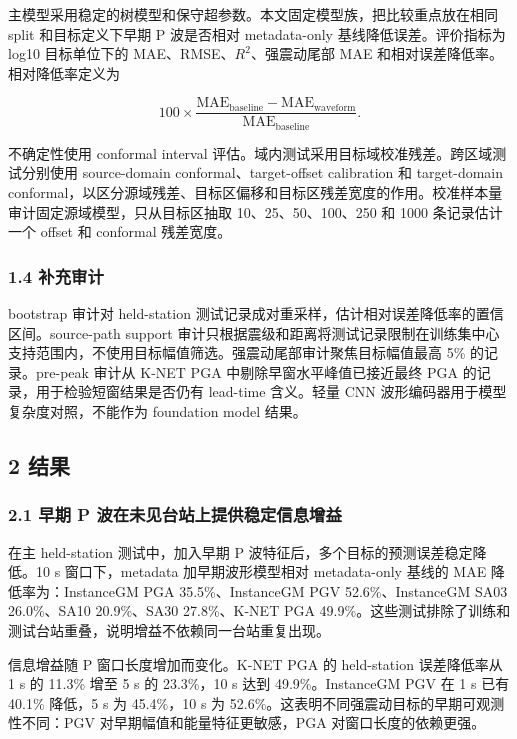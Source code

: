 \documentclass[
  11pt,
]{ctexart}
\begin{document}
主模型采用稳定的树模型和保守超参数。本文固定模型族，把比较重点放在相同
split 和目标定义下早期 P 波是否相对 metadata-only
基线降低误差。评价指标为 log10 目标单位下的
MAE、RMSE、\(R^2\)、强震动尾部 MAE 和相对误差降低率。相对降低率定义为

\[
100 \times \frac{\mathrm{MAE}_{\mathrm{baseline}}-\mathrm{MAE}_{\mathrm{waveform}}}{\mathrm{MAE}_{\mathrm{baseline}}}.
\]

不确定性使用 conformal interval
评估。域内测试采用目标域校准残差。跨区域测试分别使用 source-domain
conformal、target-offset calibration 和 target-domain
conformal，以区分源域残差、目标区偏移和目标区残差宽度的作用。校准样本量审计固定源域模型，只从目标区抽取
10、25、50、100、250 和 1000 条记录估计一个 offset 和 conformal
残差宽度。

\subsubsection{1.4 补充审计}\label{ux8865ux5145ux5ba1ux8ba1}

bootstrap 审计对 held-station
测试记录成对重采样，估计相对误差降低率的置信区间。source-path support
审计只根据震级和距离将测试记录限制在训练集中心支持范围内，不使用目标幅值筛选。强震动尾部审计聚焦目标幅值最高
5\% 的记录。pre-peak 审计从 K-NET PGA 中剔除早窗水平峰值已接近最终 PGA
的记录，用于检验短窗结果是否仍有 lead-time 含义。轻量 CNN
波形编码器用于模型复杂度对照，不能作为 foundation model 结果。

\subsection{2 结果}\label{ux7ed3ux679c}

\subsubsection{2.1 早期 P
波在未见台站上提供稳定信息增益}\label{ux65e9ux671f-p-ux6ce2ux5728ux672aux89c1ux53f0ux7ad9ux4e0aux63d0ux4f9bux7a33ux5b9aux4fe1ux606fux589eux76ca}

在主 held-station 测试中，加入早期 P
波特征后，多个目标的预测误差稳定降低。10 s 窗口下，metadata
加早期波形模型相对 metadata-only 基线的 MAE 降低率为：InstanceGM PGA
35.5\%、InstanceGM PGV 52.6\%、InstanceGM SA03 26.0\%、SA10 20.9\%、SA30
27.8\%、K-NET PGA
49.9\%。这些测试排除了训练和测试台站重叠，说明增益不依赖同一台站重复出现。

信息增益随 P 窗口长度增加而变化。K-NET PGA 的 held-station 误差降低率从
1 s 的 11.3\% 增至 5 s 的 23.3\%，10 s 达到 49.9\%。InstanceGM PGV 在 1
s 已有 40.1\% 降低，5 s 为 45.4\%，10 s 为
52.6\%。这表明不同强震动目标的早期可观测性不同：PGV
对早期幅值和能量特征更敏感，PGA 对窗口长度的依赖更强。
\end{document}
